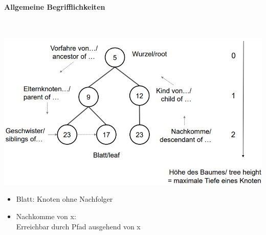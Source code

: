 \documentclass[
    ngerman,
    color=3b,
    load_common, %
    summary,
    boxarc,
]{tuda_summary}
\begin{document}
\paragraph{Allgemeine Begrifflichkeiten}\mbox{}\\

\begin{minipage}[c]{0.59\textwidth}\mbox{}
    \includegraphics[width=\linewidth-10pt]{pictures/baumBegriffe1.PNG}
\end{minipage}
\begin{minipage}[c]{0.4\textwidth}\mbox{}
    \vspace{-.5cm}
    \begin{itemize}
        \item Blatt: Knoten ohne Nachfolger
        \item Nachkomme von x: \\
              Erreichbar durch Pfad ausgehend von x
    \end{itemize}
\end{minipage}

\clearpage
\end{document}
